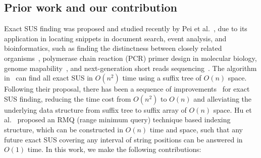\documentclass[11pt]{llncs}
\begin{document}
\subsection{Prior work and our contribution}
Exact SUS finding was proposed and studied recently by Pei et
al.~\cite{PWY-ICDE2013}, due to its application in locating snippets 
in document
search, event analysis, and bioinformatics, such as
finding the distinctness
between closely related organisms~\cite{HPMW-bio2005}, polymerase chain reaction
(PCR) primer design in molecular biology, genome
mapability~\cite{DEMKRGR-2012}, and next-generation short reads
sequencing~\cite{ABFMK-2015}.  The algorithm in~\cite{PWY-ICDE2013} can find all
exact SUS in $O(n^2)$ time using a suffix tree of $O(n)$ space.
Following their proposal, there has been a sequence of
improvements~\cite{TIBT2014,IKX-tcs2015}
for exact SUS finding, reducing the time cost from $O(n^2)$ to $O(n)$
and alleviating the underlying data structure from suffix tree to
suffix array of $O(n)$ space. 
Hu et al.~\cite{HPT-spire2014} proposed an RMQ (range minimum query)
technique based indexing structure, which can be constructed in $O(n)$
time and space, such that any future exact SUS covering any interval of
string positions can be answered in $O(1)$ time.
In this work, we make the following contributions: 
\end{document}
